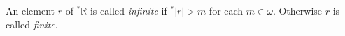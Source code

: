 An element $r$ of $^*\mathbb{R}$ is called \emph{infinite} if $^*|r| > m$ for each $m \in \omega$. Otherwise $r$ is called \emph{finite}.
